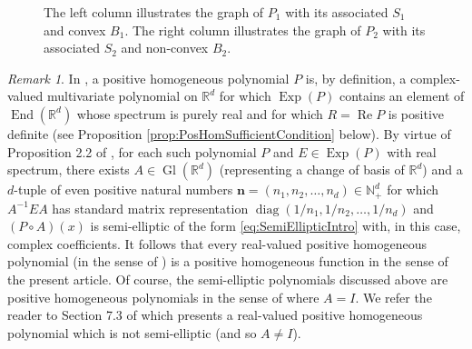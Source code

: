 \documentclass[11pt]{article}
\newenvironment{example}
  {\pushQED{\qed}\renewcommand{\qedsymbol}{$\triangle$}\examplex}
  {\popQED\endexamplex}
\theoremstyle{remark}
\newtheorem{remark}{Remark}
\renewcommand\Re{\operatorname{Re}}%
\newcommand\End{\operatorname{End}} %
\newcommand\Gl{\operatorname{Gl}} %
\newcommand\Exp{\operatorname{Exp}}
\newcommand\diag{\operatorname{diag}}
\begin{document}
\begin{example}
\begin{figure}[!htb]
\begin{subfigure}{0.5\textwidth}
    \end{subfigure}
    \caption{The left column illustrates the graph of $P_1$ with its associated $S_1$ and convex $B_1$. The right column illustrates the graph of $P_2$ with its associated $S_2$ and non-convex $B_2$.}
    \label{fig:PoneAndtwo}
\end{figure}
\begin{remark}\label{rmk:PositiveHomogeneousPolynomialsVSFunctions}
In \cite{randles_convolution_2017}, a positive homogeneous polynomial $P$ is, by definition, a complex-valued multivariate polynomial on $\mathbb{R}^d$ for which $\Exp(P)$ contains an element of $\End(\mathbb{R}^d)$ whose spectrum is purely real and for which $R=\Re P$ is positive definite (see Proposition \ref{prop:PosHomSufficientCondition} below). By virtue of Proposition 2.2 of \cite{randles_convolution_2017}, for each such polynomial $P$ and $E\in\Exp(P)$ with real spectrum, there exists $A\in\Gl(\mathbb{R}^d)$ (representing a change of basis of $\mathbb{R}^d$) and a $d$-tuple of even positive natural numbers $\mathbf{n}=(n_1,n_2,\dots,n_d)\in\mathbb{N}_+^d$ for which $A^{-1}EA$ has standard matrix representation $\diag(1/n_1,1/n_2,\dots,1/n_d)$ and $(P\circ A)(x)$ is semi-elliptic of the form \eqref{eq:SemiEllipticIntro} with, in this case, complex coefficients. It follows that every real-valued positive homogeneous polynomial (in the sense of \cite{randles_convolution_2017}) is a positive homogeneous function in the sense of the present article. Of course, the semi-elliptic polynomials discussed above are positive homogeneous polynomials in the sense of \cite{randles_convolution_2017} where $A=I$. We refer the reader to Section 7.3 of \cite{randles_convolution_2017} which presents a real-valued positive homogeneous polynomial which is not semi-elliptic (and so $A\neq I$).
\end{remark}
\end{example}
\end{document}
